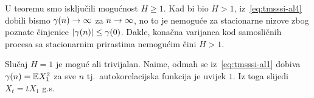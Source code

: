 \documentclass[main.tex]{subfiles}
\begin{document}
\begin{komentar}
	U teoremu smo isključili mogućnost \( H \ge 1 \). Kad bi bio \( H > 1 \),
	iz~\eqref{eq:tmsssi-al4} dobili bismo \( \gamma(n) \rightarrow \infty \) za \( n \rightarrow \infty \),
	no to je nemoguće za stacionarne nizove zbog poznate činjenice \( \left| {\gamma(n)} \right| \le \gamma(0) \).
	Dakle, konačna varijanca kod samosličnih procesa sa stacionarnim prirastima nemogućim čini \( H > 1 \).

	Slučaj \( H=1 \) je moguć ali trivijalan. Naime, odmah se iz~\eqref{eq:tmsssi-al1}
	dobiva \( \gamma(n) = \mathbb{E} X_1^2 \) za sve \( n \) tj.\ autokorelacijska funkcija je uvijek \( 1 \).
	Iz toga slijedi \( X_t = tX_1 \) g.s.
\end{komentar}
\end{document}
